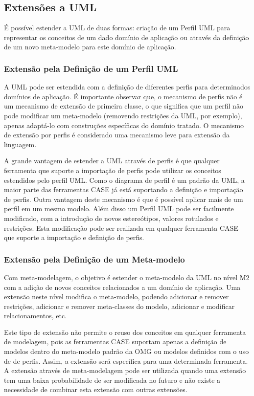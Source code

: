 \subsection{Extensões a UML}

É possível estender a UML de duas formas: criação de um Perfil UML para representar os conceitos de um dado domínio de aplicação ou através da
definição de um novo meta-modelo para este domínio de aplicação.

\subsubsection{Extensão pela Definição de um Perfil UML}

A UML pode ser estendida com a definição de diferentes perfis para determinados domínios de aplicação. É importante observar que, o mecanismo de
perfis não é um mecanismo de extensão de primeira classe, o que significa que um perfil não pode modificar um meta-modelo (removendo restrições da
UML, por exemplo), apenas adaptá-lo com construções específicas do domínio tratado. O mecanismo de extensão por perfis é considerado uma mecanismo
leve para extensão da linguagem.

A grande vantagem de estender a UML através de perfis é que qualquer ferramenta que suporte a importação de perfis pode utilizar os conceitos
estendidos pelo perfil UML. Como o diagrama de perfil é um padrão da UML, a maior parte das ferramentas CASE já está suportando a definição e
importação de perfis. Outra vantagem deste mecanismo é que é possível aplicar mais de um perfil em um mesmo modelo. Além disso um Perfil UML pode ser
facilmente modificado, com a introdução de novos estereótipos, valores rotulados e restrições. Esta modificação pode ser realizada em qualquer ferramenta 
CASE que suporte a importação e definição de perfis.

\subsubsection{Extensão pela Definição de um Meta-modelo}

Com meta-modelagem, o objetivo é estender o meta-modelo da UML no nível M2 com a adição de novos conceitos relacionados a um domínio de aplicação. Uma
extensão neste nível modifica o meta-modelo, podendo adicionar e remover restrições, adicionar e remover meta-classes do modelo, adicionar e
modificar relacionamentos, etc. 

Este tipo de extensão não permite o reuso dos conceitos em qualquer ferramenta de modelagem, pois as ferramentas CASE suportam apenas a definição de
modelos dentro do meta-modelo padrão da OMG ou modelos definidos com o uso de de perfis. Assim, a extensão será específica para uma determinada
ferramenta. A extensão através de meta-modelagem pode ser utilizada quando uma extensão tem uma baixa probabilidade de ser modificada no futuro e não
existe a necessidade de combinar esta extensão com outras extensões.

